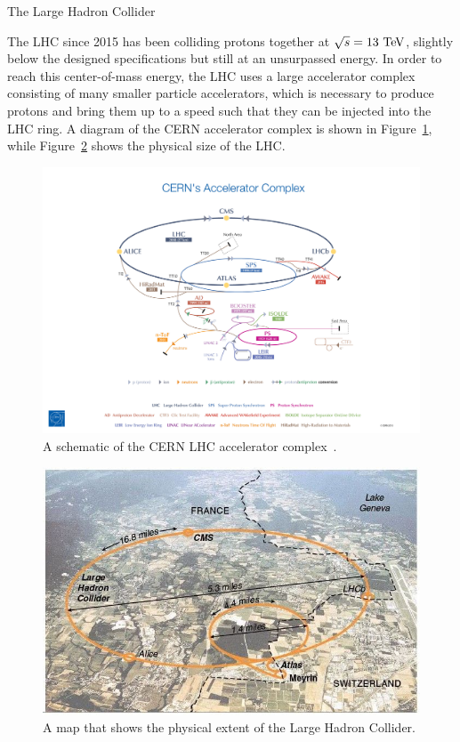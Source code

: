 \begin{section}{The Large Hadron Collider}

The LHC since 2015 has been colliding protons together at $\sqrt{s} = 13~\mathrm{Te\kern -0.1em V}$, slightly below the designed specifications but still at an unsurpassed energy.
In order to reach this center-of-mass energy, the LHC uses a large accelerator complex consisting of many smaller particle accelerators, which is necessary to produce protons and bring them up to a speed such that they can be injected into the LHC ring.
A diagram of the CERN accelerator complex is shown in Figure~\ref{fig:lhc_accelerator_complex}, while Figure~\ref{fig:lhc_map} shows the physical size of the LHC.

\begin{figure}[tbp!]
\begin{center}
\includegraphics[angle=0,width=0.95\columnwidth]{fig/lhc_accelerator_complex.jpg}
\end{center}
\caption{A schematic of the CERN LHC accelerator complex~\cite{Marcastel:1621583}.}
\label{fig:lhc_accelerator_complex}
\end{figure}

\begin{figure}[tbp!]
\begin{center}
\includegraphics[angle=0,width=0.65\columnwidth]{fig/lhc_map.jpg}
\end{center}
\caption{A map that shows the physical extent of the Large Hadron Collider.}
\label{fig:lhc_map}
\end{figure}


\end{section}
